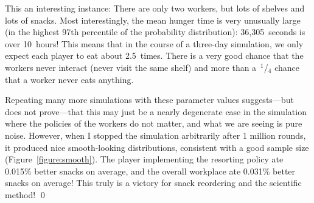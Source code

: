 \documentclass[twocolumn]{article}
\newcommand\sfrac[2]{{}\,$^{#1}$\!/{}\!$_{#2}$}
\begin{document}
This an interesting instance: There are only two workers, but lots of
shelves and lots of snacks. Most interestingly, the mean hunger time is very unusually large (in the highest 97th percentile of the probability distribution): 36,305~seconds is over 10~hours! This means that in the course of a three-day simulation, we only expect each player to eat about 2.5~times. There is a very good chance that the workers never interact (never visit the same shelf) and more than a \sfrac{1}{4} chance that a worker never eats anything.

Repeating many more simulations with these parameter values
suggests---but does not prove---that this may just be a nearly
degenerate case in the simulation where the policies of the workers do
not matter, and what we are seeing is pure noise. However, when I
stopped the simulation arbitrarily after 1 million rounds, it produced
nice smooth-looking distributions, consistent with a good sample size
(Figure~\ref{figure:smooth}). The player implementing the resorting
policy ate 0.015\% better snacks on average, and the overall workplace
ate 0.031\% better snacks on average! This truly is a victory for
snack reordering and the scientific method! \qed
\end{document}
